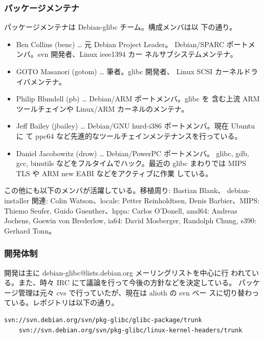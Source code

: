 \documentclass[mingoth,a4paper]{jsarticle}
\begin{document}
  \subsubsection{パッケージメンテナ}

    パッケージメンテナは Debian-glibc チーム。構成メンバは以
    下の通り。

	\begin{itemize}
	\item Ben Collins (benc) … 元 Debian Project Leader。
	      Debian/SPARC ポートメンバ。svn 開発者、Linux ieee1394 カー
	      ネルサブシステムメンテナ。
	\item GOTO Masanori (gotom) … 筆者。glibc 開発者、
	      Linux SCSI カーネルドライバメンテナ。
	\item Philip Blundell (pb) … Debian/ARM ポートメンバ。glibc を
	      含む上流 ARM ツールチェインや Linux/ARM カーネルのメンテナ。
	\item Jeff Bailey (jbailey) … Debian/GNU hurd-i386 ポートメンバ。現在 Ubuntu に
	      て ppc64 など先進的なツールチェインメンテナンスを行っている。
	\item Daniel Jacobowitz (drow) … Debian/PowerPC ポートメンバ。
	      glibc, gdb, gcc, binutils などをフルタイムでハック。最近の glibc 
	      まわりでは MIPS TLS や ARM new EABI などをアクティブに作業
	      している。
	\end{itemize}

      この他にも以下のメンバが活躍している。移植周り: Bastian Blank、
      debian-installer 関連: Colin Watson、locale: Petter Reinholdtsen,
      Denis Barbier、MIPS: Thiemo Seufer, Guido Guenther、hppa:
      Carlos O'Donell, amd64: Andreas Jochens, Goswin von Brederlow,
      ia64: David Mosberger, Randolph Chung, s390: Gerhard Tonn。

    \subsubsection{開発体制}

    開発は主に debian-glibc@lists.debian.org メーリングリストを中心に行
    われている。また、時々 IRC にて議論を行って今後の方針などを決定している。
    パッケージ管理は元々 cvs で行っていたが、現在は alioth の svn ベー
    スに切り替わっている。レポジトリは以下の通り。

	\begin{Verbatim}[frame=single]
	svn://svn.debian.org/svn/pkg-glibc/glibc-package/trunk
	svn://svn.debian.org/svn/pkg-glibc/linux-kernel-headers/trunk
	\end{Verbatim}
\end{document}
